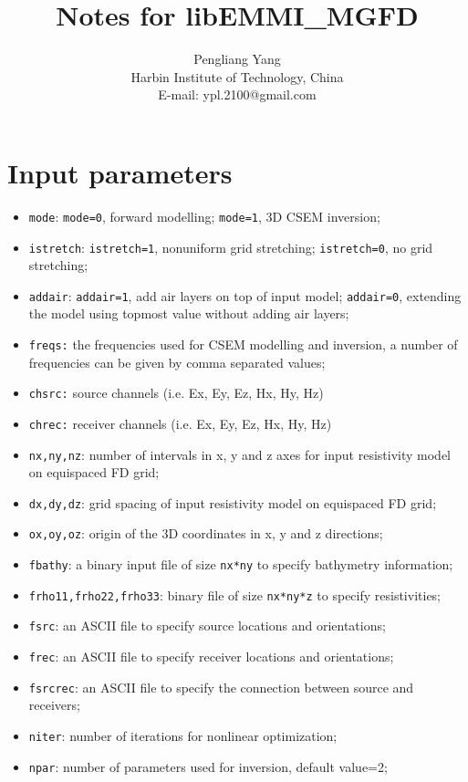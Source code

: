 \documentclass[a4paper,10pt]{article}
\title{Notes for libEMMI\_MGFD}
\author{Pengliang Yang\\
Harbin Institute of Technology, China\\
E-mail: ypl.2100@gmail.com}
\begin{document}
\maketitle


\section{Input parameters}
\begin{itemize}
\item \verb|mode|: \texttt{mode=0}, forward modelling; \texttt{mode=1}, 3D CSEM inversion;
\item \verb|istretch|:  \texttt{istretch=1}, nonuniform grid stretching;  \texttt{istretch=0}, no grid stretching;
\item \verb|addair|: \texttt{addair=1}, add air layers on top of input model; \texttt{addair=0}, extending the model using topmost value without adding air layers;
\item \verb|freqs:| the frequencies used for CSEM modelling and inversion, a number of frequencies can be given by comma separated values;
\item \verb|chsrc:| source channels (i.e. Ex, Ey, Ez, Hx, Hy, Hz)
\item \verb|chrec:| receiver channels (i.e. Ex, Ey, Ez, Hx, Hy, Hz)
\item \verb|nx,ny,nz|: number of intervals in x, y and z axes for input resistivity model on equispaced FD grid;
\item \verb|dx,dy,dz|: grid spacing of input resistivity model on equispaced FD grid;
\item \verb|ox,oy,oz|: origin of the 3D coordinates in x, y and z directions;
\item \verb|fbathy|: a binary input file of size \texttt{nx*ny} to specify bathymetry information;
\item \verb|frho11,frho22,frho33|: binary file of size \texttt{nx*ny*z} to specify resistivities;
\item \verb|fsrc|: an ASCII file to specify source locations and orientations;
\item \verb|frec|: an ASCII file to specify receiver locations and orientations;
\item \verb|fsrcrec|: an ASCII file to specify the connection between source and receivers;
\item \verb|niter|: number of iterations for nonlinear optimization;
\item \verb|npar|: number of parameters used for inversion, default value=2;

\end{itemize}
\end{document}
